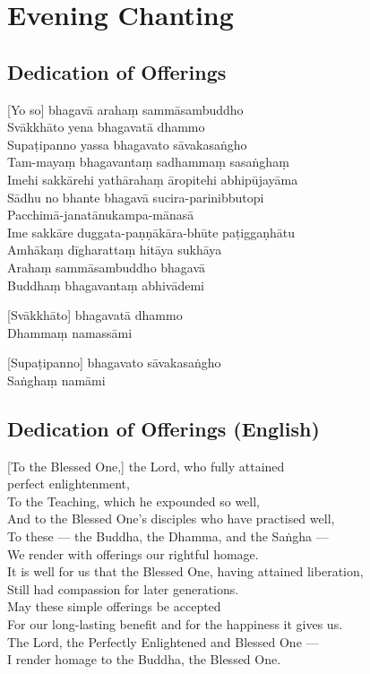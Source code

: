 \chapter{Evening Chanting}

\section*{Dedication of Offerings}


[Yo so] bhagavā arahaṃ sammāsambuddho\\
Svākkhāto yena bhagavatā dhammo\\
Supaṭipanno yassa bhagavato sāvakasaṅgho\\
Tam-mayaṃ bhagavantaṃ sadhammaṃ sasaṅghaṃ\\
Imehi sakkārehi yathārahaṃ āropitehi abhipūjayāma\\
Sādhu no bhante bhagavā sucira-parinibbutopi\\
Pacchimā-janatānukampa-mānasā\\
Ime sakkāre duggata-paṇṇākāra-bhūte paṭiggaṇhātu\\
Amhākaṃ dīgharattaṃ hitāya sukhāya\\
Arahaṃ sammāsambuddho bhagavā\\
Buddhaṃ bhagavantaṃ abhivādemi

[Svākkhāto] bhagavatā dhammo\\
Dhammaṃ namassāmi

[Supaṭipanno] bhagavato sāvakasaṅgho\\
Saṅghaṃ namāmi

\section*{Dedication of Offerings (English)}

[To the Blessed One,] the Lord, who fully attained\\
\vin perfect enlightenment,\\
To the Teaching, which he expounded so well,\\
And to the Blessed One's disciples who have practised well,\\
To these --- the Buddha, the Dhamma, and the Saṅgha ---\\
We render with offerings our rightful homage.\\
It is well for us that the Blessed One, having attained liberation,\\
Still had compassion for later generations.\\
May these simple offerings be accepted\\
For our long-lasting benefit and for the happiness it gives us.\\
The Lord, the Perfectly Enlightened and Blessed One ---\\
I render homage to the Buddha, the Blessed One.

